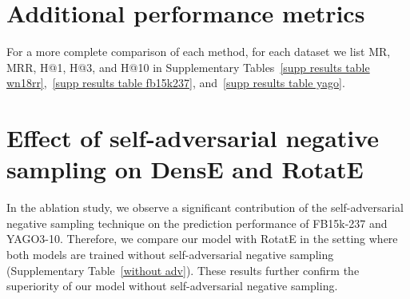 \documentclass[11pt]{article}
\begin{document}
\section{Additional performance metrics}

For a more complete comparison of each method, for each dataset we list MR, MRR, H@1, H@3, and H@10 in Supplementary Tables~\ref{supp results table wn18rr},~\ref{supp results table fb15k237}, and~\ref{supp results table yago}.

\section{Effect of self-adversarial negative sampling on DensE and RotatE}
In the ablation study, we observe a significant contribution of the self-adversarial negative sampling technique on the prediction performance of FB15k-237 and YAGO3-10. Therefore, we compare our model with RotatE in the setting where both models are trained without self-adversarial negative sampling (Supplementary Table~\ref{without adv}). These results further confirm the superiority of our model without self-adversarial negative sampling.
\end{document}
